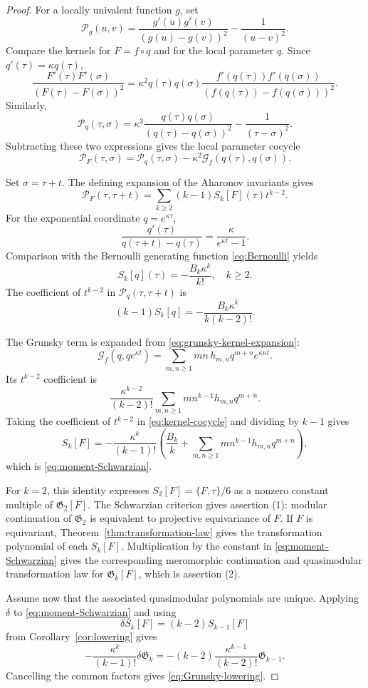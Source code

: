 \documentclass[11pt]{amsart}
\theoremstyle{definition}
\theoremstyle{remark}
\numberwithin{equation}{section}
\begin{document}
\begin{proof}
For a locally univalent function $g$, set
\[
\mathcal P_g(u,v)
=
\frac{g'(u)g'(v)}{(g(u)-g(v))^2}-\frac1{(u-v)^2}.
\]
Compare the kernels for $F=f\circ q$ and for the local parameter $q$. Since $q'(\tau)=\kappa q(\tau)$,
\[
\frac{F'(\tau)F'(\sigma)}{(F(\tau)-F(\sigma))^2}
=\kappa^2q(\tau)q(\sigma)
 \frac{f'(q(\tau))f'(q(\sigma))}
 {(f(q(\tau))-f(q(\sigma)))^2}.
\]
Similarly,
\[
\mathcal P_q(\tau,\sigma)
=\kappa^2\frac{q(\tau)q(\sigma)}{(q(\tau)-q(\sigma))^2}
-\frac1{(\tau-\sigma)^2}.
\]
Subtracting these two expressions gives the local parameter cocycle
\begin{equation}\label{eq:kernel-cocycle}
\mathcal P_F(\tau,\sigma)
=
\mathcal P_q(\tau,\sigma)
-\kappa^2\mathcal G_f(q(\tau),q(\sigma)).
\end{equation}

Set $\sigma=\tau+t$. The defining expansion of the Aharonov invariants gives
\[
\mathcal P_F(\tau,\tau+t)
=\sum_{k\geq2}(k-1)S_k[F](\tau)t^{k-2}.
\]
For the exponential coordinate $q=e^{\kappa\tau}$,
\[
\frac{q'(\tau)}{q(\tau+t)-q(\tau)}
=\frac{\kappa}{e^{\kappa t}-1}.
\]
Comparison with the Bernoulli generating function \eqref{eq:Bernoulli} yields
\begin{equation*}
S_k[q](\tau)=-\frac{B_k\kappa^k}{k!},
\quad k\geq2.
\end{equation*}
The coefficient of $t^{k-2}$ in $\mathcal P_q(\tau,\tau+t)$ is
\[
(k-1)S_k[q]
=-\frac{B_k\kappa^k}{k(k-2)!}.
\]

The Grunsky term is expanded from \eqref{eq:grunsky-kernel-expansion}:
\[
\mathcal G_f(q,qe^{\kappa t})
=
\sum_{m,n\geq1}mn\,h_{m,n}q^{m+n}e^{\kappa nt}.
\]
Its $t^{k-2}$ coefficient is
\[
\frac{\kappa^{k-2}}{(k-2)!}
\sum_{m,n\geq1}m n^{k-1}h_{m,n}q^{m+n}.
\]
Taking the coefficient of $t^{k-2}$ in \eqref{eq:kernel-cocycle} and dividing by $k-1$ gives
\[
S_k[F]
=-\frac{\kappa^k}{(k-1)!}
\left(
\frac{B_k}{k}
+\sum_{m,n\geq1}m n^{k-1}h_{m,n}q^{m+n}
\right),
\]
which is \eqref{eq:moment-Schwarzian}.

For $k=2$, this identity expresses $S_2[F]=\{F,\tau\}/6$ as a nonzero constant multiple of $\mathfrak G_2[F]$. The Schwarzian criterion gives assertion (1): modular continuation of $\mathfrak G_2$ is equivalent to projective equivariance of $F$. If $F$ is equivariant, Theorem~\ref{thm:transformation-law} gives the transformation polynomial of each $S_k[F]$. Multiplication by the constant in \eqref{eq:moment-Schwarzian} gives the corresponding meromorphic continuation and quasimodular transformation law for $\mathfrak G_k[F]$, which is assertion (2).

Assume now that the associated quasimodular polynomials are unique. Applying $\delta$ to \eqref{eq:moment-Schwarzian} and using
\[
\delta S_k[F]=(k-2)S_{k-1}[F]
\]
from Corollary~\ref{cor:lowering} gives
\[
-\frac{\kappa^k}{(k-1)!}\delta\mathfrak G_k
=-(k-2)\frac{\kappa^{k-1}}{(k-2)!}\mathfrak G_{k-1}.
\]
Cancelling the common factors gives \eqref{eq:Grunsky-lowering}.
\end{proof}
\end{document}
